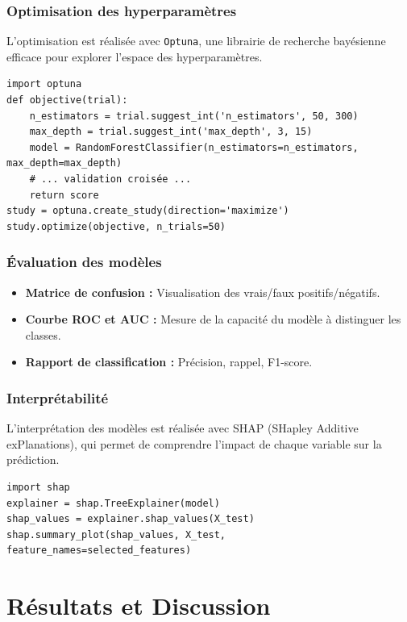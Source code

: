 \documentclass[12pt,a4paper]{report}
\begin{document}
\subsection{Optimisation des hyperparamètres}
L'optimisation est réalisée avec \texttt{Optuna}, une librairie de recherche bayésienne efficace pour explorer l'espace des hyperparamètres.

\begin{lstlisting}[caption={Exemple d'optimisation avec Optuna}, label={lst:optuna}]
import optuna
def objective(trial):
    n_estimators = trial.suggest_int('n_estimators', 50, 300)
    max_depth = trial.suggest_int('max_depth', 3, 15)
    model = RandomForestClassifier(n_estimators=n_estimators, max_depth=max_depth)
    # ... validation croisée ...
    return score
study = optuna.create_study(direction='maximize')
study.optimize(objective, n_trials=50)
\end{lstlisting}

\subsection{Évaluation des modèles}
\begin{itemize}
    \item \textbf{Matrice de confusion :} Visualisation des vrais/faux positifs/négatifs.
    \item \textbf{Courbe ROC et AUC :} Mesure de la capacité du modèle à distinguer les classes.
    \item \textbf{Rapport de classification :} Précision, rappel, F1-score.
\end{itemize}

\subsection{Interprétabilité}
L'interprétation des modèles est réalisée avec SHAP (SHapley Additive exPlanations), qui permet de comprendre l'impact de chaque variable sur la prédiction.

\begin{lstlisting}[caption={Interprétation avec SHAP}, label={lst:shap}]
import shap
explainer = shap.TreeExplainer(model)
shap_values = explainer.shap_values(X_test)
shap.summary_plot(shap_values, X_test, feature_names=selected_features)
\end{lstlisting}

\chapter{Résultats et Discussion}
\end{document}
